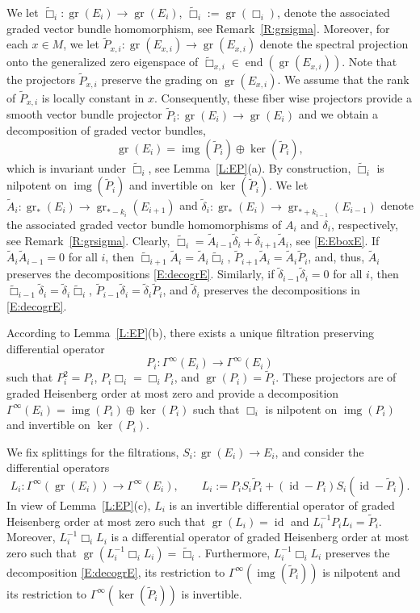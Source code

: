 \documentclass[reqno,12pt]{amsart}
\DeclareMathOperator{\img}{img}
\DeclareMathOperator{\gr}{gr}
\DeclareMathOperator{\id}{id}
\DeclareMathOperator{\eend}{end}
\theoremstyle{plain}
\theoremstyle{definition}
\begin{document}
We let $\tilde\Box_i\colon\gr(E_i)\to\gr(E_i)$, $\tilde\Box_i:=\gr(\Box_i)$, denote the associated graded vector bundle homomorphism, see Remark~\ref{R:grsigma}.
Moreover, for each $x\in M$, we let $\tilde P_{x,i}\colon\gr(E_{x,i})\to \gr(E_{x,i})$ denote the spectral projection onto the generalized zero eigenspace of $\tilde\Box_{x,i}\in\eend(\gr(E_{x,i}))$.
Note that the projectors $\tilde P_{x,i}$ preserve the grading on $\gr(E_{x,i})$.
We assume that the rank of $\tilde P_{x,i}$ is locally constant in $x$. 
Consequently, these fiber wise projectors provide a smooth vector bundle projector $\tilde P_i\colon\gr(E_i)\to\gr(E_i)$ and we obtain a decomposition of graded vector bundles, 
\begin{equation}\label{E:decogrE}
\gr(E_i)=\img(\tilde P_i)\oplus\ker(\tilde P_i),
\end{equation}
which is invariant under $\tilde\Box_i$, see Lemma~\ref{L:EP}(a).
By construction, $\tilde\Box_i$ is nilpotent on $\img(\tilde P_i)$ and invertible on $\ker(\tilde P_i)$.
We let $\tilde A_i\colon\gr_*(E_i)\to\gr_{*-k_i}(E_{i+1})$ and $\tilde\delta_i\colon\gr_*(E_i)\to\gr_{*+k_{i-1}}(E_{i-1})$ denote the associated graded vector bundle homomorphisms of $A_i$ and $\delta_i$, respectively, see Remark~\ref{R:grsigma}.
Clearly, $\tilde\Box_i=\tilde A_{i-1}\tilde\delta_i+\tilde\delta_{i+1}\tilde A_i$, see \eqref{E:EboxE}.
If $\tilde A_i\tilde A_{i-1}=0$ for all $i$, then $\tilde\Box_{i+1}\tilde A_i=\tilde A_i\tilde\Box_i$, $\tilde P_{i+1}\tilde A_i=\tilde A_i\tilde P_i$, and, thus, $\tilde A_i$ preserves the decompositions \eqref{E:decogrE}.
Similarly, if $\tilde\delta_{i-1}\tilde\delta_i=0$ for all $i$, then $\tilde\Box_{i-1}\tilde\delta_i=\tilde\delta_i\tilde\Box_i$, $\tilde P_{i-1}\tilde\delta_i=\tilde\delta_i\tilde P_i$, and $\tilde\delta_i$ preserves the decompositions in \eqref{E:decogrE}.


According to Lemma~\ref{L:EP}(b), there exists a unique filtration preserving differential operator 
$$
P_i\colon\Gamma^\infty(E_i)\to\Gamma^\infty(E_i)
$$ 
such that $P_i^2=P_i$, $P_i\Box_i=\Box_iP_i$, and $\gr(P_i)=\tilde P_i$.
These projectors are of graded Heisenberg order at most zero and provide a decomposition $\Gamma^\infty(E_i)=\img(P_i)\oplus\ker(P_i)$ such that $\Box_i$ is nilpotent on $\img(P_i)$ and invertible on $\ker(P_i)$.


We fix splittings for the filtrations, $S_i\colon\gr(E_i)\to E_i$, and consider the differential operators 
$$
L_i\colon\Gamma^\infty(\gr(E_i))\to\Gamma^\infty(E_i),\qquad
L_i:=P_iS_i\tilde P_i+(\id-P_i)S_i(\id-\tilde P_i).
$$
In view of Lemma~\ref{L:EP}(c), $L_i$ is an invertible differential operator of graded Heisenberg order at most zero such that $\gr(L_i)=\id$ and $L_i^{-1}P_iL_i=\tilde P_i$.
Moreover, $L^{-1}_i\Box_iL_i$ is a differential operator of graded Heisenberg order at most zero such that $\gr(L_i^{-1}\Box_iL_i)=\tilde\Box_i$.
Furthermore, $L^{-1}_i\Box_iL_i$ preserves the decomposition \eqref{E:decogrE}, its restriction to $\Gamma^\infty(\img(\tilde P_i))$ is nilpotent and its restriction to $\Gamma^\infty(\ker(\tilde P_i))$ is invertible.
\end{document}
